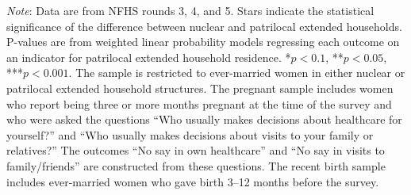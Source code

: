 \documentclass[10pt,twoside,reqno]{article}
\begin{document}
\begin{table}[H]
\sansmath
\sffamily
\captionsetup{style=CAPTAB}
\caption{Pregnant women in patrilocal extended households are advantaged in wealth and maternal healthcare use, but disadvantaged in autonomy outcomes}
\label{tab:sumstats}
\vspace{-4pt}

\begin{scriptsize}
\setlength{\tabcolsep}{3.5pt}
\renewcommand{\arraystretch}{1.15}



\end{scriptsize}

\vspace{1ex}
\small\scriptsize{\textsf{\textit{Note}: Data are from NFHS rounds 3, 4, and 5.}} \small\scriptsize{\textsf{Stars indicate the statistical significance of the difference between nuclear and patrilocal extended households. P-values are from weighted linear probability models regressing each outcome on an indicator for patrilocal extended household residence.}} \small\scriptsize{\textsf{*$p<0.1$, **$p<0.05$, ***$p<0.001$.}}
\newline\small\scriptsize{\textsf{The sample is restricted to ever-married women in either nuclear or patrilocal extended household structures. The pregnant sample includes women who report being three or more months pregnant at the time of the survey and who were asked the questions ``Who usually makes decisions about healthcare for yourself?'' and ``Who usually makes decisions about visits to your family or relatives?''}} \small\scriptsize{\textsf{The outcomes ``No say in own healthcare'' and ``No say in visits to family/friends'' are constructed from these questions. The recent birth sample includes ever-married women who gave birth 3--12 months before the survey.}}

\end{table}



\end{document}
